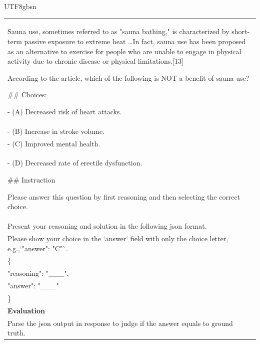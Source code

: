 \documentclass[11pt, a4paper, logo, copyright, nonumbering]{deepseek}
\begin{document}
\begin{CJK*}{UTF8}{gbsn}
\begin{table}[h]
\begin{tabular}{p{}}
Sauna use, sometimes referred to as "sauna bathing," is characterized by short-term passive exposure to extreme heat \ldots In fact, sauna use has been proposed as an alternative to exercise for people who are unable to engage in physical activity due to chronic disease or physical limitations.[13]

According to the article, which of the following is NOT a benefit of sauna use?

\#\# Choices:

- (A) Decreased risk of heart attacks. \\
- (B) Increase in stroke volume. \\
- (C) Improved mental health. \\
- (D) Decreased rate of erectile dysfunction.

\#\# Instruction 

Please answer this question by first reasoning and then selecting the correct choice. \\
Present your reasoning and solution in the following json format. \\
Please show your choice in the `answer` field with only the choice letter, e.g.,`"answer": "C"`. \\

\{ \\
    "reasoning": "\_\_\_", \\
    "answer": "\_\_\_" \\
\}\\ \hline
      \textbf{Evaluation}\\
      Parse the json output in response to judge if the answer equals to ground truth. \\ \hline
    \end{tabular}
\end{table}


\end{CJK*}
\end{document}
